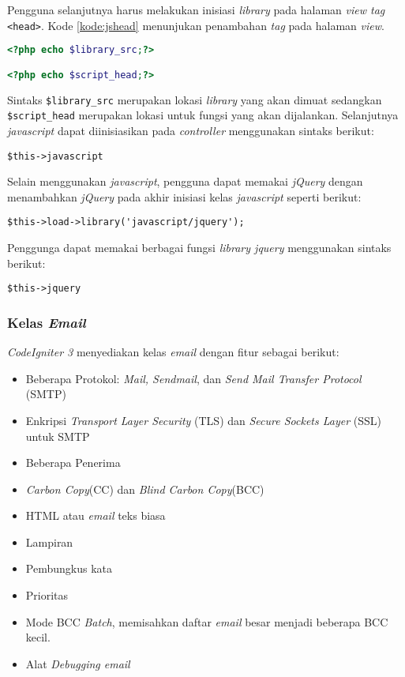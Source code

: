 Pengguna selanjutnya harus melakukan inisiasi \textit{library} pada halaman \textit{view tag} \verb|<head>|. Kode \ref{kode:jshead} menunjukan penambahan \textit{tag} pada halaman \textit{view}.

\begin{lstlisting}[language=PHP, caption=Contoh penambahan \textit{tag} pada \textit{file} \textit{view}, label=kode:jshead]
<?php echo $library_src;?>

<?php echo $script_head;?>
\end{lstlisting}

Sintaks \verb|$library_src| merupakan lokasi \textit{library} yang akan dimuat sedangkan \verb|$script_head| merupakan lokasi untuk fungsi yang akan dijalankan. Selanjutnya \textit{javascript} dapat diinisiasikan pada \textit{controller} menggunakan sintaks berikut:

\begin{center}
	\verb|$this->javascript|
\end{center}

Selain menggunakan \textit{javascript}, pengguna dapat memakai \textit{jQuery} dengan menambahkan \textit{jQuery} pada akhir inisiasi kelas \textit{javascript} seperti berikut:

\begin{center}
\verb|$this->load->library('javascript/jquery');|
\end{center}

Penggunga dapat memakai berbagai fungsi \textit{library jquery} menggunakan sintaks berikut:

\begin{center}
\verb|$this->jquery|
\end{center}

\subsubsection{Kelas \textit{Email}}
\textit{CodeIgniter 3} menyediakan kelas \textit{email} dengan fitur sebagai berikut:

\begin{itemize}
\item Beberapa Protokol: \textit{Mail, Sendmail}, dan \textit{Send Mail Transfer Protocol} (SMTP)
\item Enkripsi \textit{Transport Layer Security} (TLS) dan \textit{Secure Sockets Layer} (SSL) untuk SMTP
\item Beberapa Penerima
\item \textit{Carbon Copy}(CC) dan \textit{Blind Carbon Copy}(BCC)
\item HTML atau \textit{email} teks biasa
\item Lampiran
\item Pembungkus kata
\item Prioritas
\item Mode BCC \textit{Batch}, memisahkan daftar \textit{email} besar menjadi beberapa BCC kecil.
\item Alat \textit{Debugging email}
\end{itemize}

